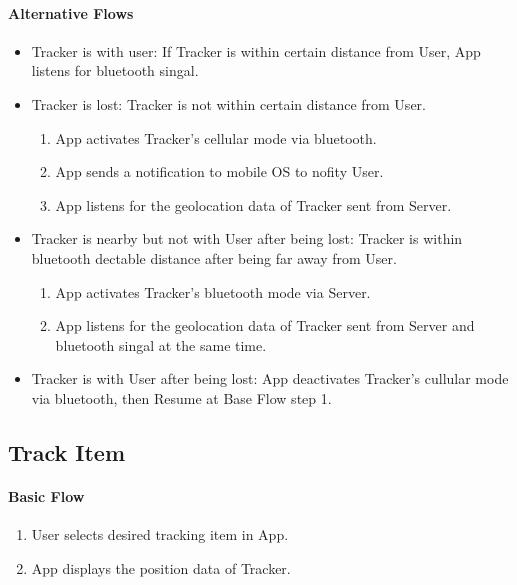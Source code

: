 \documentclass[12pt,a4paper]{article}
\begin{document}
\begin{appendices}
          \paragraph{Alternative Flows}
          \begin{itemize}
            \item Tracker is with user: If Tracker is within certain distance from User, App listens for bluetooth singal.
            \item Tracker is lost: Tracker is not within certain distance from User.
            \begin{enumerate}
              \item App activates Tracker's cellular mode via bluetooth.
              \item App sends a notification to mobile OS to nofity User.
              \item App listens for the geolocation data of Tracker sent from Server.
            \end{enumerate}    
            \item Tracker is nearby but not with User after being lost: Tracker is within bluetooth dectable distance after being far away from User.
            \begin{enumerate}
              \item App activates Tracker's bluetooth mode via Server.
              \item App listens for the geolocation data of Tracker sent from Server and bluetooth singal at the same time.
            \end{enumerate}    
            \item Tracker is with User after being lost: App deactivates Tracker's cullular mode via bluetooth, then Resume at Base Flow step 1.
          \end{itemize}
          
        \subsection{Track Item}
          \paragraph{Basic Flow}
            \begin{enumerate}
              \item User selects desired tracking item in App.
              \item App displays the position data of Tracker.
            \end{enumerate}
      

\end{appendices}
\end{document}
